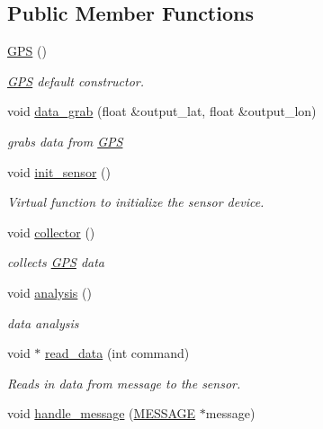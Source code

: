 \subsection*{Public Member Functions}
\begin{DoxyCompactItemize}
\item 
\hyperlink{classGPS_a0c347a188512d0d5cf7ed5c91b145fc4}{G\-P\-S} ()
\begin{DoxyCompactList}\small\item\em \hyperlink{classGPS}{G\-P\-S} default constructor. \end{DoxyCompactList}\item 
void \hyperlink{classGPS_a669ad6e30c411499d069fcb9ffeea876}{data\-\_\-grab} (float \&output\-\_\-lat, float \&output\-\_\-lon)
\begin{DoxyCompactList}\small\item\em grabs data from \hyperlink{classGPS}{G\-P\-S} \end{DoxyCompactList}\item 
void \hyperlink{classGPS_aebb999362899800a7e372e873bb5b943}{init\-\_\-sensor} ()
\begin{DoxyCompactList}\small\item\em Virtual function to initialize the sensor device. \end{DoxyCompactList}\item 
void \hyperlink{classGPS_a17383568c4ed86a0adfdd5c88b6591d4}{collector} ()
\begin{DoxyCompactList}\small\item\em collects \hyperlink{classGPS}{G\-P\-S} data \end{DoxyCompactList}\item 
void \hyperlink{classGPS_a4dca50736c5e49f831515219536823b2}{analysis} ()
\begin{DoxyCompactList}\small\item\em data analysis \end{DoxyCompactList}\item 
void $\ast$ \hyperlink{classGPS_aa04076536ee9f7e2679895c69b07ad58}{read\-\_\-data} (int command)
\begin{DoxyCompactList}\small\item\em Reads in data from message to the sensor. \end{DoxyCompactList}\item 
\hypertarget{classGPS_a803a498352e30044136502a9e036d380}{void \hyperlink{classGPS_a803a498352e30044136502a9e036d380}{handle\-\_\-message} (\hyperlink{SUBSYS__COMMANDS_8h_ad814416fc1a8c675bea2687d96088a8f}{M\-E\-S\-S\-A\-G\-E} $\ast$message)}\label{classGPS_a803a498352e30044136502a9e036d380}


\end{DoxyCompactItemize}

